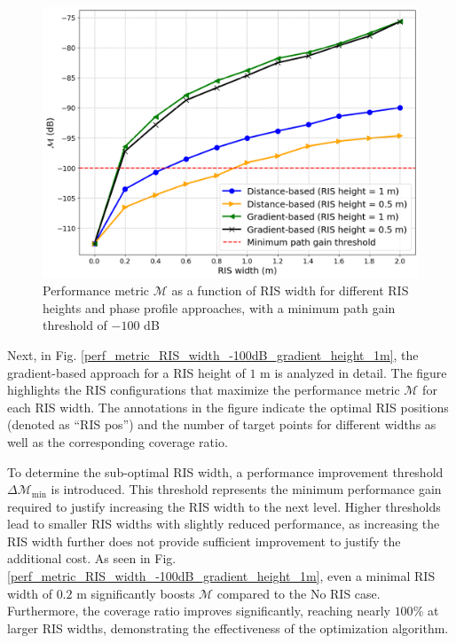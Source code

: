 \documentclass{IEEEoj}
\begin{document}
\begin{figure}
	\centering
	\includegraphics[width=\linewidth]{Sim_Results/perf_metric_RIS_width_multiple_curves_-100dB.png}
	\caption{Performance metric $\mathcal{M}$ as a function of RIS width for different RIS heights and phase profile approaches, with a minimum path gain threshold of $-100$ dB}
	\label{perf_metric_RIS_width_multiple_curves_-100dB}
\end{figure}

Next, in Fig. \ref{perf_metric_RIS_width_-100dB_gradient_height_1m}, the gradient-based approach for a RIS height of $1$ m is analyzed in detail. The figure highlights the RIS configurations that maximize the performance metric $\mathcal{M}$ for each RIS width. The annotations in the figure indicate the optimal RIS positions (denoted as “RIS pos”) and the number of target points for different widths as well as the corresponding coverage ratio.

To determine the sub-optimal RIS width, a performance improvement threshold $\Delta \mathcal{M}_{\text{min}}$ is introduced. This threshold represents the minimum performance gain required to justify increasing the RIS width to the next level. Higher thresholds lead to smaller RIS widths with slightly reduced performance, as increasing the RIS width further does not provide sufficient improvement to justify the additional cost. As seen in Fig. \ref{perf_metric_RIS_width_-100dB_gradient_height_1m}, even a minimal RIS width of $0.2$ m significantly boosts $\mathcal{M}$ compared to the No RIS case. Furthermore, the coverage ratio improves significantly, reaching nearly $100\%$ at larger RIS widths, demonstrating the effectiveness of the optimization algorithm.
\end{document}
